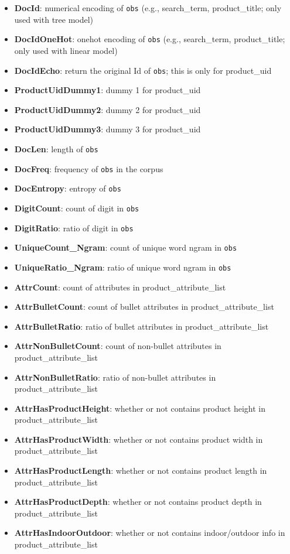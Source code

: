 \documentclass[12pt]{article}
\begin{document}
\begin{itemize}
\item \textbf{DocId}: numerical encoding of \texttt{obs} (e.g., search\_term, product\_title; only used with tree model)
\item \textbf{DocIdOneHot}: onehot encoding of \texttt{obs} (e.g., search\_term, product\_title; only used with linear model)
\item \textbf{DocIdEcho}: return the original Id of \texttt{obs}; this is only for product\_uid
\item \textbf{ProductUidDummy1}: dummy 1 for product\_uid
\item \textbf{ProductUidDummy2}: dummy 2 for product\_uid
\item \textbf{ProductUidDummy3}: dummy 3 for product\_uid
\item \textbf{DocLen}: length of \texttt{obs}
\item \textbf{DocFreq}: frequency of \texttt{obs} in the corpus
\item \textbf{DocEntropy}: entropy of \texttt{obs}
\item \textbf{DigitCount}: count of digit in \texttt{obs}
\item \textbf{DigitRatio}: ratio of digit in \texttt{obs}
\item \textbf{UniqueCount\_Ngram}: count of unique word ngram in \texttt{obs}
\item \textbf{UniqueRatio\_Ngram}: ratio of unique word ngram in \texttt{obs}
\item \textbf{AttrCount}: count of attributes in product\_attribute\_list
\item \textbf{AttrBulletCount}: count of bullet attributes in product\_attribute\_list
\item \textbf{AttrBulletRatio}: ratio of bullet attributes in product\_attribute\_list
\item \textbf{AttrNonBulletCount}: count of non-bullet attributes in product\_attribute\_list
\item \textbf{AttrNonBulletRatio}: ratio of non-bullet attributes in product\_attribute\_list
\item \textbf{AttrHasProductHeight}: whether or not contains product height in product\_attribute\_list
\item \textbf{AttrHasProductWidth}: whether or not contains product width in product\_attribute\_list
\item \textbf{AttrHasProductLength}: whether or not contains product length in product\_attribute\_list
\item \textbf{AttrHasProductDepth}: whether or not contains product depth in product\_attribute\_list
\item \textbf{AttrHasIndoorOutdoor}: whether or not contains indoor/outdoor info in product\_attribute\_list
\end{itemize}
\end{document}
